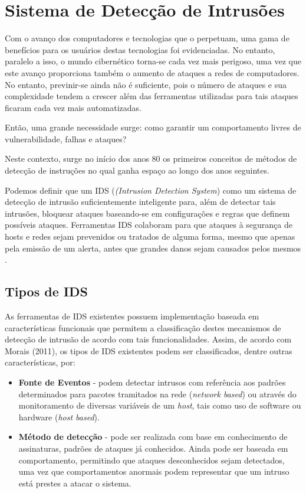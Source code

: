 \chapter{Sistema de Detecção de Intrusões}
\label{chap:IDS}

	Com o avanço dos computadores e tecnologias que o perpetuam, uma gama de benefícios para os usuários destas tecnologias foi evidenciadas. No entanto, paralelo a isso, o mundo cibernético torna-se cada vez mais perigoso, uma vez que este avanço proporciona também o aumento de ataques a redes de computadores. No entanto, previnir-se ainda não é suficiente, pois o número de ataques e sua complexidade tendem a crescer além das ferramentas utilizadas para tais ataques ficaram cada vez mais automatizadas.

	Então, uma grande necessidade surge: como garantir um comportamento livres de vulnerabilidade, falhas e ataques?

	Neste contexto, surge no início dos anos 80 os primeiros conceitos de métodos de detecção de instruções no qual ganha espaço ao longo dos anos seguintes.

	Podemos definir que um IDS (\textit{(Intrusion Detection System}) como um sistema de detecção de intrusão suficientemente inteligente para, além de detectar tais intrusões, bloquear ataques baseando-se em configurações e regras que definem possíveis ataques. Ferramentas IDS colaboram para que ataques à segurança de hosts e redes sejam prevenidos ou tratados de alguma forma, mesmo que apenas pela emissão de um alerta, antes que grandes danos sejam causados pelos mesmos \cite{Comunidade_Snort_Brasil}.

	\section{Tipos de IDS}
	\label{sec:IDS_Tipos}

	As ferramentas de IDS existentes possuem implementação baseada em características funcionais que permitem a classificação destes mecanismos de detecção de intrusão de acordo com tais funcionalidades. Assim, de acordo com Morais (2011), os tipos de IDS existentes podem ser classificados, dentre outras características, por:
		\begin{itemize}
			\item \textbf{Fonte de Eventos} - podem detectar intrusos com referência aos padrões determinados para pacotes tramitados na rede (\textit{network based}) ou através do monitoramento de diversas variáveis de um \textit{host}, tais como uso de software ou hardware (\textit{host based}).
	
			\item \textbf{Método de detecção} - pode ser realizada com base em conhecimento de assinaturas, padrões de ataques já conhecidos. Ainda pode ser baseada em comportamento, permitindo que ataques desconhecidos sejam detectados, uma vez que comportamentos anormais podem representar que um intruso está prestes a atacar o sistema.	
		\end{itemize}

